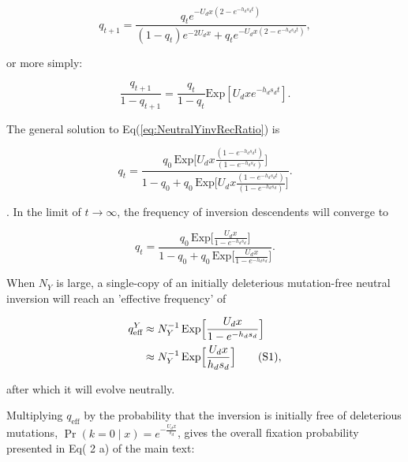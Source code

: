 \documentclass{article}
\newcommand\hl[1]{%
  \bgroup
  \hskip0pt\color{blue!80!black}%
  #1%
  \egroup
}
\newcommand\numberthis{\addtocounter{equation}{1}\tag{\theequation}}
\begin{document}
\begin{equation}\label{eq:NeutralYinvRec}
	q_{t+1} = \frac{ q_t e^{-U_d x(2 - e^{-h_d s_d t})} }{(1 - q_t) e^{-2 U_d x} + q_t e^{-U_d x(2 - e^{-h_d s_d t})}},
\end{equation} 

\noindent or more simply:

\begin{equation}\label{eq:NeutralYinvRecRatio}
	\frac{q_{t+1}}{1- q_{t+1}} = \frac{q_{t}}{1- q_{t}} \text{Exp}[U_d x e^{-h_d s_d t}].
\end{equation} 

\noindent The general solution to Eq(\ref{eq:NeutralYinvRecRatio}) is 

\begin{equation}\label{eq:NeutralYinvGenSol}
	q_{t} = \frac{q_{0} \, \text{Exp}\Bigg[ U_d x \frac{(1 - e^{-h_d s_d t})}{(1 - e^{-h_d s_d})} \Bigg]} {1 - q_{0} + q_0 \, \text{Exp}\Bigg[ U_d x \frac{(1 - e^{-h_d s_d t})}{(1 - e^{-h_d s_d})} \Bigg]}.
\end{equation} 

\noindent \citep[see][]{ConnallonOlito2020}. In the limit of $t \rightarrow \infty$, the frequency of inversion descendents will converge to 

\begin{equation}\label{eq:NeutralYinvGenSolLimit}
	q_{t} = \frac{q_{0} \, \text{Exp}\Big[ \frac{U_d x}{1 - e^{-h_d s_d} } \Big]} {1 - q_{0} + q_0 \, \text{Exp}\Big[ \frac{U_d x}{1 - e^{-h_d s_d} } \Big]}.
\end{equation} 

\noindent When $N_Y$ is large, a single-copy of an initially deleterious mutation-free neutral inversion will reach an 'effective frequency' of

\begin{align*}\label{eq:NeutralYinvQEff}
	q^Y_{\text{eff}} & \approx N^{-1}_Y \, \text{Exp}\Big[ \frac{U_d x}{1 - e^{-h_d s_d} } \Big] \\
	 &\approx N^{-1}_Y \, \text{Exp}\Big[ \frac{U_d x}{h_d s_d} \Big] \numberthis,
\end{align*} 

\noindent after which it will evolve neutrally. 

Multiplying $q_{\text{eff}}$ by the probability that the inversion is initially free of deleterious mutations, $\Pr(k = 0 \mid x) = e^{-\frac{U_d x}{s_d}}$, gives the overall fixation probability presented in Eq(\hl{2}a) of the main text:
\end{document}
